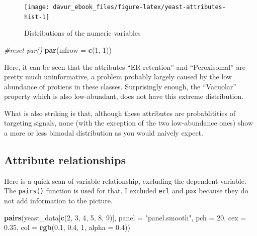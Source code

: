 \documentclass[]{book}
\newenvironment{Shaded}{\begin{snugshade}}{\end{snugshade}}
\newcommand{\CommentTok}[1]{\textcolor[rgb]{0.56,0.35,0.01}{\textit{#1}}}
\newcommand{\DataTypeTok}[1]{\textcolor[rgb]{0.13,0.29,0.53}{#1}}
\newcommand{\DecValTok}[1]{\textcolor[rgb]{0.00,0.00,0.81}{#1}}
\newcommand{\FloatTok}[1]{\textcolor[rgb]{0.00,0.00,0.81}{#1}}
\newcommand{\KeywordTok}[1]{\textcolor[rgb]{0.13,0.29,0.53}{\textbf{#1}}}
\newcommand{\NormalTok}[1]{#1}
\newcommand{\StringTok}[1]{\textcolor[rgb]{0.31,0.60,0.02}{#1}}
\begin{document}
\begin{figure}
\texttt{[image: davur\_ebook\_files/figure-latex/yeast-attributes-hist-1]} \caption{Distributions of the numeric variables}\label{fig:yeast-attributes-hist}
\end{figure}

\begin{Shaded}
\begin{Highlighting}[]
\CommentTok{#reset par()}
\KeywordTok{par}\NormalTok{(}\DataTypeTok{mfrow =} \KeywordTok{c}\NormalTok{(}\DecValTok{1}\NormalTok{, }\DecValTok{1}\NormalTok{))}
\end{Highlighting}
\end{Shaded}

Here, it can be seen that the attributes ``ER-retention'' and ``Peroxisomal'' are pretty much uninformative, a problem probably largely caused by the low abundance of protiens in these classes. Surprisingly enough, the ``Vacuolar'' property which is also low-abundant, does not have this extreme distribution.

What is also striking is that, although these attributes are probablitities of targeting signals, none (with the exception of the two low-abundance ones) show a more or less bimodal distribution as you would naively expect.

\hypertarget{attribute-relationships}{%
\subsection{Attribute relationships}\label{attribute-relationships}}

Here is a quick scan of variable relationship, excluding the dependent variable. The \texttt{pairs()} function is used for that. I excluded \texttt{erl} and \texttt{pox} because they do not add information to the picture.

\begin{Shaded}
\begin{Highlighting}[]
\KeywordTok{pairs}\NormalTok{(yeast_data[}\KeywordTok{c}\NormalTok{(}\DecValTok{2}\NormalTok{, }\DecValTok{3}\NormalTok{, }\DecValTok{4}\NormalTok{, }\DecValTok{5}\NormalTok{, }\DecValTok{8}\NormalTok{, }\DecValTok{9}\NormalTok{)],}
      \DataTypeTok{panel =} \StringTok{"panel.smooth"}\NormalTok{,}
      \DataTypeTok{pch =} \DecValTok{20}\NormalTok{, }
      \DataTypeTok{cex =} \FloatTok{0.35}\NormalTok{,}
      \DataTypeTok{col =} \KeywordTok{rgb}\NormalTok{(}\FloatTok{0.1}\NormalTok{, }\FloatTok{0.4}\NormalTok{, }\DecValTok{1}\NormalTok{, }\DataTypeTok{alpha =} \FloatTok{0.4}\NormalTok{))}
\end{Highlighting}
\end{Shaded}
\end{document}
